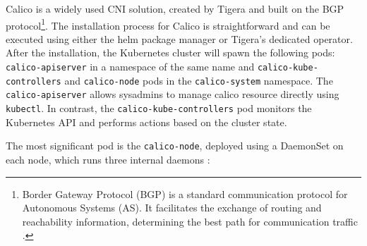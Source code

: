 Calico is a widely used CNI solution, created by Tigera and built on the BGP
protocol\footnote{Border Gateway Protocol (BGP) is a standard communication
  protocol for Autonomous Systems (AS). It facilitates the exchange of routing
  and reachability information, determining the best path for communication
  traffic \cite{BGPnistdef}.}.
The installation process for Calico is straightforward and can be executed using
either the helm package manager or Tigera's dedicated operator.
After the installation, the Kubernetes cluster will spawn the following pods:
\texttt{calico-apiserver} in a namespace of the same name and
\texttt{calico-kube-controllers} and \texttt{calico-node} pods in the
\texttt{calico-system} namespace.
The \texttt{calico-apiserver} allows sysadmins to manage calico resource
directly using \texttt{kubectl}.
In contrast, the \texttt{calico-kube-controllers} pod monitors the Kubernetes
API and performs actions based on the cluster state.

The most significant pod is the \texttt{calico-node}, deployed using a DaemonSet
on each node, which runs three internal daemons \cite{calicodoc}:

